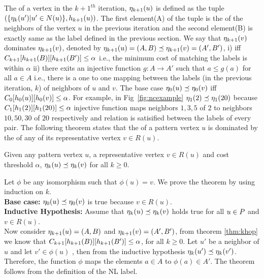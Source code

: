 The \ncl of a vertex in the ${k+1}^{th}$ iteration, $\eta_{k+1}(u)$ is
defined as
the tuple $(\{\eta_{k}(u') | u' \in N(u)\}, h_{k+1}(u))$.
The first element(A) of the tuple is the \ncl of the neighbors of the
vertex $u$ in the previous iteration and the second element(B) is exactly
same as the \khop label defined in the previous section. We say that
$\eta_{k+1}(v)$ dominates $\eta_{k+1}(v)$, denoted by 
$\eta_{k+1}(u) = (A, B) \preceq \eta_{k+1}(v) = (A', B') $, 
i) iff $C_{k+1}[h_{k+1}(B)][h_{k+1}(B')] \leq \alpha$ i.e., the minimum cost 
of matching the \khop labels is within $\alpha$
ii) there exits an injective
function $g\!\!:A\rightarrow A'$ such that $a \leq g(a)$ for 
all $a \in A$ i.e., there is a one to one mapping between the \ncl labels
(in the previous iteration, $k$) of neighbors of $u$ and $v$.
The base case $\eta_{0}(u) \preceq \eta_{0}(v)$ iff 
$C_{0}[h_{0}(u)][h_{0}(v)] \leq \alpha$. For example, in Fig~\ref{fig:ncexample} 
$\eta_{1}(2) \preceq \eta_{1}(20)$ because $C_{1}[h_{1}(2)][h_{1}(20)] \leq \alpha$
injective function maps neighbors $1, 3, 5$ of $2$ to neighbors
$10, 50, 30$ of $20$ respectively and  relation 
is satisiﬁed between the \ncl labels of every pair. The following theorem
states that the \ncl of a pattern vertex $u$ is dominated by the
\ncl of any of its representative vertex $v \in  R(u)$.

\begin{thm}
Given any pattern vertex $u$, a representative vertex $v \in R(u)$ and cost
threshold $\alpha$, $\eta_{k}(u) \preceq \eta_{k}(v)$ for all
$k \geq 0$.
\begin{myproof} Let $\phi$ be any isomorphism
such that $\phi(u) = v$.
We prove the theorem by using induction on $k$.\\
\textbf{Base case:} $\eta_{0}(u) \preceq \eta_{0}(v)$ is true because
$v \in R(u)$. \\
\textbf{Inductive Hypothesis:} Assume that $\eta_{k}(u) \preceq \eta_{k}(v)$
holds true for all $u \in P$ and $v \in R(u)$. \\
Now consider 
$\eta_{k+1}(u) = (A, B)$  and $ \eta_{k+1}(v) = (A', B') $, from theorem
\ref{thm:khop} we know that $C_{k+1}[h_{k+1}(B)][h_{k+1}(B')] \leq \alpha$, for all
$k \geq 0$. Let $u'$ be a neighbor of $u$ and let $v' \in \phi(u)$
, then from the inductive hypothesis $\eta_{k}(u') \preceq \eta_{k}(v')$.
Therefore, the function $\phi$ maps the elements $a \in A$ to $\phi(a) \in A'$.
The theorem follows from the definition of the NL label.
\end{myproof}
\label{thm:ncl}
\end{thm}


